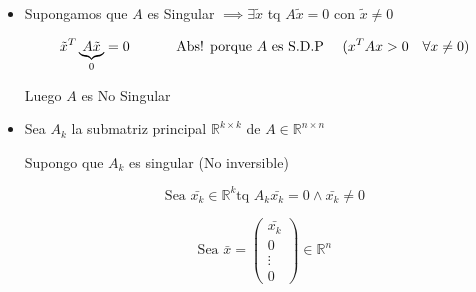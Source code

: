 \begin{itemize}

\item Supongamos que $A$ es Singular \(\implies \exists \tilde{x} \) tq \(A\tilde{x} = 0 \) con \(\tilde{x} \neq 0 \)

\begin{equation}
\tilde{x}^{T}\underbrace{A\tilde{x}}_{0} = 0 \text{\hspace{3em} Abs! porque $A$ es S.D.P \hspace{1em}} (x^{T}Ax > 0 \hspace{1em}\forall x \neq 0)
\end{equation}


Luego $A$ es No Singular

\item Sea $A_{k}$ la submatriz principal $\mathbb{R}^{k\times k}$ de $A \in \mathbb{R}^{n \times n}$

Supongo que $A_{k}$ es singular (No inversible)

\[\text{Sea } \bar{x_{k}} \in \mathbb{R}^{k} \text{tq } A_{k} \bar{x_{k}} = 0  \land \bar{x_{k}} \neq 0 \]

\[ \text{Sea } \bar{x} = \begin{pmatrix} \bar{x_{k}} \\ 0 \\ \vdots \\ 0 \end{pmatrix} \in \mathbb{R}^{n} \]


\end{itemize}
